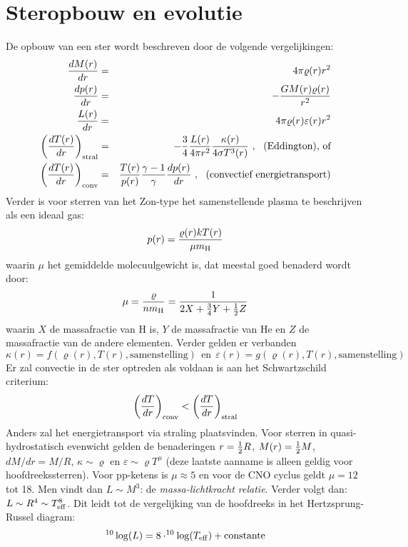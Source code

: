 \documentclass[twoside]{report}
\begin{document}
\section{Steropbouw en evolutie}
De opbouw van een ster wordt beschreven door de volgende vergelijkingen:
\begin{eqnarray*}
\frac{dM(r)}{dr}&=&4\pi\varrho(r)r^2\\
\frac{dp(r)}{dr}&=&-\frac{GM(r)\varrho(r)}{r^2}\\
\frac{L(r)}{dr}&=&4\pi\varrho(r)\varepsilon(r)r^2\\
\left(\frac{dT(r)}{dr}\right)_{\rm stral}&=&-\frac{3}{4}\frac{L(r)}{4\pi r^2}\frac{\kappa(r)}{4\sigma T^3(r)}~,~~\mbox{(Eddington), of}\\
\left(\frac{dT(r)}{dr}\right)_{\rm conv}&=&\frac{T(r)}{p(r)}\frac{\gamma-1}{\gamma}\frac{dp(r)}{dr}~,~~\mbox{(convectief energietransport)}
\end{eqnarray*}
Verder is voor sterren van het Zon-type het samenstellende plasma te
beschrijven als een ideaal gas:
\[
p(r)=\frac{\varrho(r)kT(r)}{\mu m_{\rm H}}
\]
waarin $\mu$ het gemiddelde molecuulgewicht is, dat meestal goed benaderd
wordt door:
\[
\mu=\frac{\varrho}{nm_{\rm H}}=\frac{1}{2X+\frac{3}{4}Y+\mbox{$\frac{1}{2}$} Z}
\]
waarin $X$ de massafractie van H is, $Y$ de massafractie van He en $Z$ de
massafractie van de andere elementen. Verder gelden er verbanden
\[
\kappa(r)=f(\varrho(r),T(r),\mbox{samenstelling})~~\mbox{en}~~
\varepsilon(r)=g(\varrho(r),T(r),\mbox{samenstelling})
\]
Er zal convectie in de ster optreden als voldaan is aan het Schwartzschild
criterium:
\[
\left(\frac{dT}{dr}\right)_{\rm conv}<\left(\frac{dT}{dr}\right)_{\rm stral}
\]
Anders zal het energietransport via straling plaatsvinden. Voor sterren in
quasi-hydrostatisch evenwicht gelden de benaderingen $r=\mbox{$\frac{1}{2}$} R$,
$M(r)=\mbox{$\frac{1}{2}$} M$, $dM/dr=M/R$, $\kappa\sim\varrho$ en $\varepsilon\sim\varrho T^\mu$
(deze laatste aanname is alleen geldig voor hoofdreekssterren). Voor pp-ketens
is $\mu\approx5$ en voor de CNO cyclus geldt $\mu=12$ tot 18. Men vindt dan
$L\sim M^3$: de {\it massa-lichtkracht relatie}. Verder volgt dan:
$L\sim R^4\sim T^8_{\rm eff}$. Dit leidt tot de vergelijking van de
hoofdreeks in het Hertzsprung-Russel diagram:
\[
^{10}\log(L)=8\cdot^{10}\log(T_{\rm eff})+\mbox{constante}
\]
\end{document}
